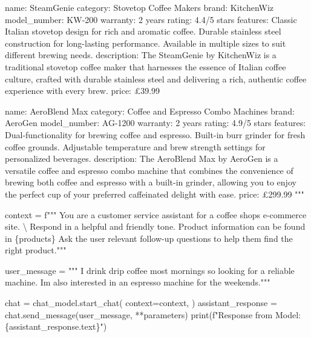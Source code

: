 \documentclass[
  letterpaper,
  DIV=11,
  numbers=noendperiod]{scrreprt}
\newenvironment{Shaded}{\begin{snugshade}}{\end{snugshade}}
\newcommand{\BuiltInTok}[1]{\textcolor[rgb]{0.00,0.23,0.31}{#1}}
\newcommand{\CharTok}[1]{\textcolor[rgb]{0.13,0.47,0.30}{#1}}
\newcommand{\NormalTok}[1]{\textcolor[rgb]{0.00,0.23,0.31}{#1}}
\newcommand{\OperatorTok}[1]{\textcolor[rgb]{0.37,0.37,0.37}{#1}}
\newcommand{\SpecialCharTok}[1]{\textcolor[rgb]{0.37,0.37,0.37}{#1}}
\newcommand{\SpecialStringTok}[1]{\textcolor[rgb]{0.13,0.47,0.30}{#1}}
\newcommand{\StringTok}[1]{\textcolor[rgb]{0.13,0.47,0.30}{#1}}
\begin{document}
\begin{Shaded}
\begin{Highlighting}[]
\StringTok{name: SteamGenie}
\StringTok{category: Stovetop Coffee Makers}
\StringTok{brand: KitchenWiz}
\StringTok{model\_number: KW{-}200}
\StringTok{warranty: 2 years}
\StringTok{rating: 4.4/5 stars}
\StringTok{features:}
\StringTok{  Classic Italian stovetop design for rich and aromatic coffee.}
\StringTok{  Durable stainless steel construction for long{-}lasting performance.}
\StringTok{  Available in multiple sizes to suit different brewing needs.}
\StringTok{description: The SteamGenie by KitchenWiz is a traditional stovetop coffee maker that harnesses the essence of Italian coffee culture, crafted with durable stainless steel and delivering a rich, authentic coffee experience with every brew.}
\StringTok{price: £39.99}

\StringTok{name: AeroBlend Max}
\StringTok{category: Coffee and Espresso Combo Machines}
\StringTok{brand: AeroGen}
\StringTok{model\_number: AG{-}1200}
\StringTok{warranty: 2 years}
\StringTok{rating: 4.9/5 stars}
\StringTok{features:}
\StringTok{  Dual{-}functionality for brewing coffee and espresso.}
\StringTok{  Built{-}in burr grinder for fresh coffee grounds.}
\StringTok{  Adjustable temperature and brew strength settings for personalized beverages.}
\StringTok{description: The AeroBlend Max by AeroGen is a versatile coffee and espresso combo machine that combines the convenience of brewing both coffee and espresso with a built{-}in grinder,}
\StringTok{allowing you to enjoy the perfect cup of your preferred caffeinated delight with ease.}
\StringTok{price: £299.99}
\StringTok{"""}
\end{Highlighting}
\end{Shaded}

\begin{Shaded}
\begin{Highlighting}[]
\NormalTok{context }\OperatorTok{=} \SpecialStringTok{f"""}
\SpecialStringTok{You are a customer service assistant for a coffee shop\textquotesingle{}s e{-}commerce site. }\CharTok{\textbackslash{}}
\SpecialStringTok{Respond in a helpful and friendly tone.}
\SpecialStringTok{Product information can be found in }\SpecialCharTok{\{}\NormalTok{products}\SpecialCharTok{\}}
\SpecialStringTok{Ask the user relevant follow{-}up questions to help them find the right product."""}

\NormalTok{user\_message }\OperatorTok{=} \StringTok{"""}
\StringTok{I drink drip coffee most mornings so looking for a reliable machine.}
\StringTok{I\textquotesingle{}m also interested in an espresso machine for the weekends."""}

\NormalTok{chat }\OperatorTok{=}\NormalTok{ chat\_model.start\_chat(}
\NormalTok{    context}\OperatorTok{=}\NormalTok{context,}
\NormalTok{)}
\NormalTok{assistant\_response }\OperatorTok{=}\NormalTok{ chat.send\_message(user\_message, }\OperatorTok{**}\NormalTok{parameters)}
\BuiltInTok{print}\NormalTok{(}\SpecialStringTok{f"Response from Model: }\SpecialCharTok{\{}\NormalTok{assistant\_response}\SpecialCharTok{.}\NormalTok{text}\SpecialCharTok{\}}\SpecialStringTok{"}\NormalTok{)}
\end{Highlighting}
\end{Shaded}
\end{document}
